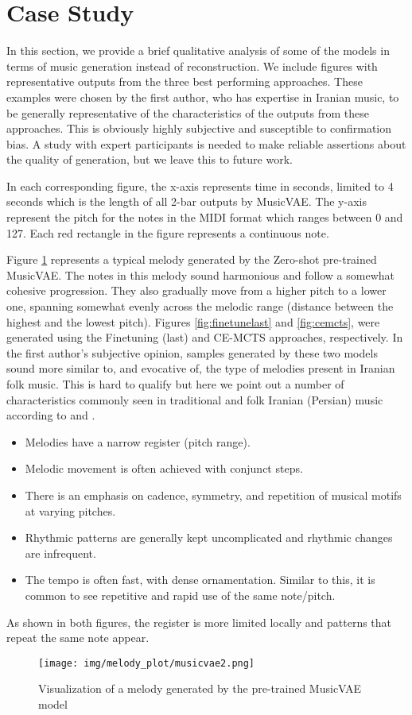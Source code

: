 \documentclass[letterpaper]{article}
\begin{document}
\section{Case Study} \label{qualitative}
In this section, we provide a brief qualitative analysis of some of the models in terms of music generation instead of reconstruction. We include figures with representative outputs from the three best performing approaches. These examples were chosen by the first author, who has expertise in Iranian music, to be generally representative of the characteristics of the outputs from these approaches. This is obviously highly subjective and susceptible to confirmation bias. A study with expert participants is needed to make reliable assertions about the quality of generation, but we leave this to future work.

In each corresponding figure, the x-axis represents time in seconds, limited to 4 seconds which is the length of all 2-bar outputs by MusicVAE. The y-axis represent the pitch for the notes in the MIDI format which ranges between 0 and 127. Each red rectangle in the figure represents a continuous note.

Figure \ref{fig:musicvae} represents a typical melody generated by the Zero-shot pre-trained MusicVAE. The notes in this melody sound harmonious and follow a somewhat cohesive progression. They also gradually move from a higher pitch to a lower one, spanning somewhat evenly across the melodic range (distance between the highest and the lowest pitch). 
Figures \ref{fig:finetunelast} and \ref{fig:cemcts}, were generated using the Finetuning (last) and CE-MCTS approaches, respectively. In the first author's subjective opinion, samples generated by these two models sound more similar to, and evocative of, the type of melodies present in Iranian folk music. This is hard to qualify but here we point out a number of characteristics commonly seen in traditional and folk Iranian (Persian) music according to \cite{farhat2004dastgah} and \cite{iranian_classical_music}. 
\begin{itemize}
    \item Melodies have a narrow register (pitch range).
    \item Melodic movement is often achieved with conjunct steps.
    \item There is an emphasis on cadence, symmetry, and repetition of musical motifs at varying pitches.
    \item Rhythmic patterns are generally kept uncomplicated and rhythmic changes are infrequent.
    \item The tempo is often fast, with dense ornamentation. Similar to this, it is common to see repetitive and rapid use of the same note/pitch.
\end{itemize}
As shown in both figures, the register is more limited locally and patterns that repeat the same note appear. 
\begin{figure}[h]
    \centering
    \texttt{[image: img/melody\_plot/musicvae2.png]}
    \caption{Visualization of a melody generated by the pre-trained MusicVAE model}
    \label{fig:musicvae}
\end{figure}
\end{document}
